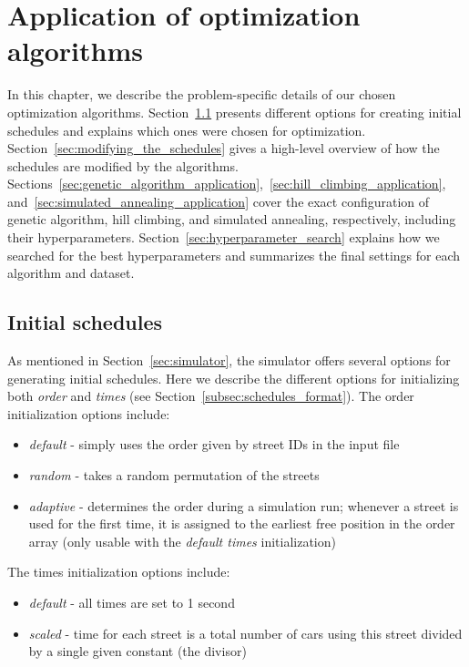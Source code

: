 \chapter{Application of optimization algorithms}

In this chapter, we describe the problem-specific details of our chosen optimization algorithms. Section~\ref{sec:initial_schedules} presents different options for creating initial schedules and explains which ones were chosen for optimization.
Section~\ref{sec:modifying_the_schedules} gives a high-level overview of how the schedules are modified by the algorithms.
Sections~\ref{sec:genetic_algorithm_application},~\ref{sec:hill_climbing_application}, and~\ref{sec:simulated_annealing_application} cover the exact configuration of genetic algorithm, hill climbing, and simulated annealing, respectively, including their hyperparameters. Section~\ref{sec:hyperparameter_search} explains how we searched for the best hyperparameters and summarizes the final settings for each algorithm and dataset.

\section{Initial schedules} \label{sec:initial_schedules}

As mentioned in Section~\ref{sec:simulator}, the simulator offers several options for generating initial schedules.
Here we describe the different options for initializing both \textit{order} and \textit{times} (see Section~\ref{subsec:schedules_format}). The order initialization options include:
\begin{itemize}
    \item \textit{default} - simply uses the order given by street IDs in the input file
    \item \textit{random} - takes a random permutation of the streets
    \item \textit{adaptive} - determines the order during a simulation run; whenever a street is used for the first time, it is assigned to the earliest free position in the order array (only usable with the \textit{default times} initialization)
\end{itemize}
The times initialization options include:
\begin{itemize}
    \item \textit{default} - all times are set to 1 second
    \item \textit{scaled} - time for each street is a total number of cars using this street divided by a single given constant (the divisor)
\end{itemize}

